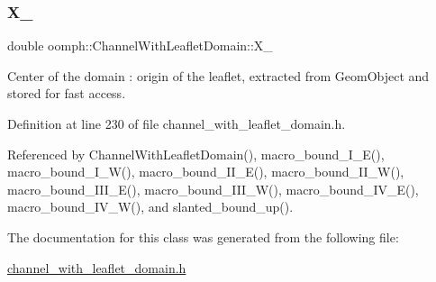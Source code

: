 \subsubsection{\texorpdfstring{X\+\_}{X\_0}}
{\footnotesize\ttfamily double oomph\+::\+Channel\+With\+Leaflet\+Domain\+::\+X\+\_\hspace{0.3cm}{\ttfamily [protected]}}



Center of the domain \+: origin of the leaflet, extracted from Geom\+Object and stored for fast access. 



Definition at line 230 of file channel\+\_\+with\+\_\+leaflet\+\_\+domain.\+h.



Referenced by Channel\+With\+Leaflet\+Domain(), macro\+\_\+bound\+\_\+\+I\+\_\+\+E(), macro\+\_\+bound\+\_\+\+I\+\_\+\+W(), macro\+\_\+bound\+\_\+\+I\+I\+\_\+\+E(), macro\+\_\+bound\+\_\+\+I\+I\+\_\+\+W(), macro\+\_\+bound\+\_\+\+I\+I\+I\+\_\+\+E(), macro\+\_\+bound\+\_\+\+I\+I\+I\+\_\+\+W(), macro\+\_\+bound\+\_\+\+I\+V\+\_\+\+E(), macro\+\_\+bound\+\_\+\+I\+V\+\_\+\+W(), and slanted\+\_\+bound\+\_\+up().



The documentation for this class was generated from the following file\+:\begin{DoxyCompactItemize}
\item 
\hyperlink{channel__with__leaflet__domain_8h}{channel\+\_\+with\+\_\+leaflet\+\_\+domain.\+h}\end{DoxyCompactItemize}
